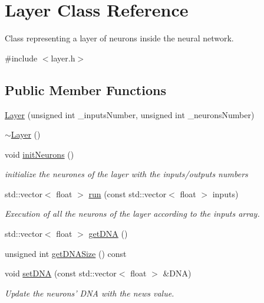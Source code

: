 \hypertarget{class_layer}{\section{Layer Class Reference}
\label{class_layer}
}


Class representing a layer of neurons inside the neural network.  




{\ttfamily \#include $<$layer.\-h$>$}

\subsection*{Public Member Functions}
\begin{DoxyCompactItemize}
\item 
\hyperlink{class_layer_a16d6a7a3cff2e9e489186400a9d0f4f2}{Layer} (unsigned int \-\_\-inputs\-Number, unsigned int \-\_\-neurons\-Number)
\item 
\hyperlink{class_layer_a1b1ba4804451dfe6cc357194e42762ae}{$\sim$\-Layer} ()
\item 
void \hyperlink{class_layer_a08ee50fd54abe23d9fc94551c7b4be3f}{init\-Neurons} ()
\begin{DoxyCompactList}\small\item\em initialize the neurones of the layer with the inputs/outputs numbers \end{DoxyCompactList}\item 
std\-::vector$<$ float $>$ \hyperlink{class_layer_a33387425a6f32b455bdca87496a891c9}{run} (const std\-::vector$<$ float $>$ inputs)
\begin{DoxyCompactList}\small\item\em Execution of all the neurons of the layer according to the inputs array. \end{DoxyCompactList}\item 
std\-::vector$<$ float $>$ \hyperlink{class_layer_a18d9fa45eb9ff61f5d5bb9c74179bf30}{get\-D\-N\-A} ()
\item 
unsigned int \hyperlink{class_layer_a01093e904ef7331b99fccc9abe1174aa}{get\-D\-N\-A\-Size} () const 
\item 
void \hyperlink{class_layer_acd14a68865522c3e63a0dab87dd3a100}{set\-D\-N\-A} (const std\-::vector$<$ float $>$ \&D\-N\-A)
\begin{DoxyCompactList}\small\item\em Update the neurons' D\-N\-A with the news value. \end{DoxyCompactList}\end{DoxyCompactItemize}


